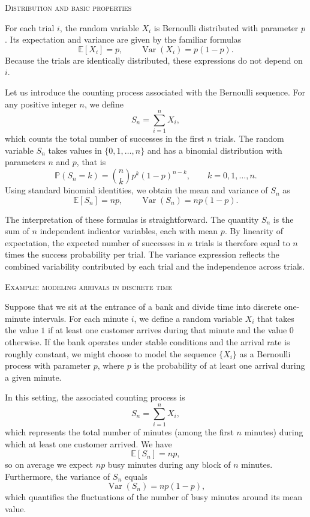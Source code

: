 \bigskip
\textsc{Distribution and basic properties}

For each trial \(i\), the random variable \(X_i\) is Bernoulli distributed with parameter \(p\).  
Its expectation and variance are given by the familiar formulas
\[
\mathbb{E}[X_i] = p,
\qquad
\operatorname{Var}(X_i) = p(1-p).
\]
Because the trials are identically distributed, these expressions do not depend on \(i\).  

Let us introduce the counting process associated with the Bernoulli sequence.  
For any positive integer \(n\), we define
\[
S_n = \sum_{i=1}^{n} X_i,
\]
which counts the total number of successes in the first \(n\) trials.  
The random variable \(S_n\) takes values in \(\{0,1,\ldots,n\}\) and has a binomial distribution with parameters \(n\) and \(p\), that is
\[
\mathbb{P}(S_n = k)
=
\binom{n}{k} p^{k} (1-p)^{n-k},
\qquad
k = 0,1,\ldots,n.
\]
Using standard binomial identities, we obtain the mean and variance of \(S_n\) as
\[
\mathbb{E}[S_n] = np,
\qquad
\operatorname{Var}(S_n) = np(1-p).
\]

The interpretation of these formulas is straightforward.  
The quantity \(S_n\) is the sum of \(n\) independent indicator variables, each with mean \(p\).  
By linearity of expectation, the expected number of successes in \(n\) trials is therefore equal to \(n\) times the success probability per trial.  
The variance expression reflects the combined variability contributed by each trial and the independence across trials.  

\bigskip
\textsc{Example: modeling arrivals in discrete time}

Suppose that we sit at the entrance of a bank and divide time into discrete one-minute intervals.  
For each minute \(i\), we define a random variable \(X_i\) that takes the value \(1\) if at least one customer arrives during that minute and the value \(0\) otherwise.  
If the bank operates under stable conditions and the arrival rate is roughly constant, we might choose to model the sequence \(\{X_i\}\) as a Bernoulli process with parameter \(p\), where \(p\) is the probability of at least one arrival during a given minute.  

In this setting, the associated counting process is
\[
S_n = \sum_{i=1}^{n} X_i,
\]
which represents the total number of minutes (among the first \(n\) minutes) during which at least one customer arrived.  
We have
\[
\mathbb{E}[S_n] = np,
\]
so on average we expect \(np\) busy minutes during any block of \(n\) minutes.  
Furthermore, the variance of \(S_n\) equals
\[
\operatorname{Var}(S_n) = np(1-p),
\]
which quantifies the fluctuations of the number of busy minutes around its mean value.  

